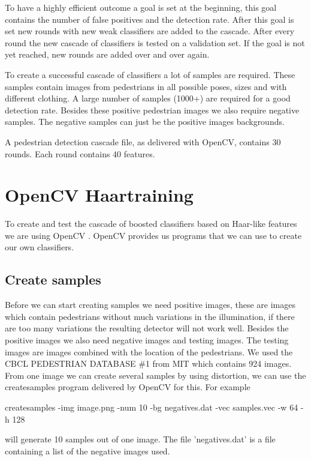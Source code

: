 \documentclass{article}
\begin{document}
To have a highly efficient outcome a goal is set at the beginning, this goal contains the number of false positives and the detection rate. After this goal is set new rounds with new weak classifiers are added to the cascade. After every round the new cascade of classifiers is tested on a validation set. If the goal is not yet reached, new rounds are added over and over again.

To create a successful cascade of classifiers a lot of samples are required. These samples contain images from pedestrians in all possible poses, sizes and with different clothing. A large number of samples (1000+) are required for a good detection rate.  Besides these positive pedestrian images we also require negative samples. The negative samples can just be the positive images backgrounds.

A pedestrian detection cascade file, as delivered with OpenCV, contains 30 rounds. Each round contains 40 features. 





\section{OpenCV Haartraining}
To create and test the cascade of boosted classifiers based on Haar-like features we are using OpenCV \cite{opencv_library}. OpenCV provides us programs that we can use to create our own classifiers.

\subsection{Create samples}
Before we can start creating samples we need positive images, these are images which contain pedestrians without much variations in the illumination, if there are too many variations the resulting detector will not work well.
Besides the positive images we also need negative images and testing images. The testing images are images combined with the location of the pedestrians. We used the CBCL PEDESTRIAN DATABASE \#1 from MIT which contains 924 images.
From one image we can create several samples by using distortion, we can use the createsamples program delivered by OpenCV for this. For example 

createsamples -img image.png -num 10 -bg negatives.dat -vec samples.vec -w 64 -h 128

will generate 10 samples out of one image.
The file 'negatives.dat' is a file containing a list of the negative images used.
\end{document}
